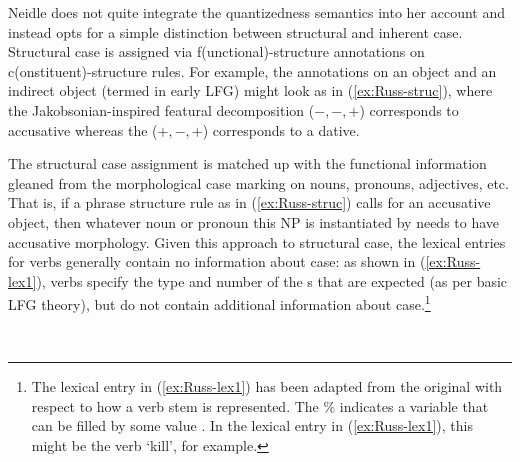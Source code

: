 \documentclass[output=paper,hidelinks]{langscibook}
\begin{document}
Neidle
does not quite integrate the quantizedness semantics into her account and
instead opts for a simple  distinction between
structural and inherent case. Structural case is assigned via
f(unctional)-structure annotations on c(onstituent)-structure rules.  For example,
the annotations on an object \OBJ and an indirect object (termed  in
early LFG) might look as
in (\ref{ex:Russ-struc}), where the Jakob\-so\-nian-inspired featural decomposition ($-,-,+$) corresponds
to accusative whereas the ($+,-,+$) corresponds to a dative.

\ea \label{ex:Russ-struc} 
\z
The structural case assignment is matched up with the functional information gleaned
from the  morphological case marking on nouns, pronouns, adjectives, etc.  That
is, if a phrase structure rule as in (\ref{ex:Russ-struc}) calls for an
accusative object, then whatever noun or pronoun this NP is instantiated by
needs to have accusative morphology.  Given this approach to
structural case, the lexical entries for verbs generally contain no information
about case:  as shown in (\ref{ex:Russ-lex1}), verbs specify the type and number
of the {\GF}s that are expected
(as per basic LFG theory), but do not contain additional information about
case.\footnote{The lexical entry in (\ref{ex:Russ-lex1}) has been adapted from
  the original with respect to how a verb stem is represented.  The  \%   indicates a variable that can be
  filled by some value \citep{xledoc}. In the lexical entry in (\ref{ex:Russ-lex1}), this might
    be the verb `kill', for example.}

  \ea \label{ex:Russ-lex1}
\\
  \z
  
\end{document}

